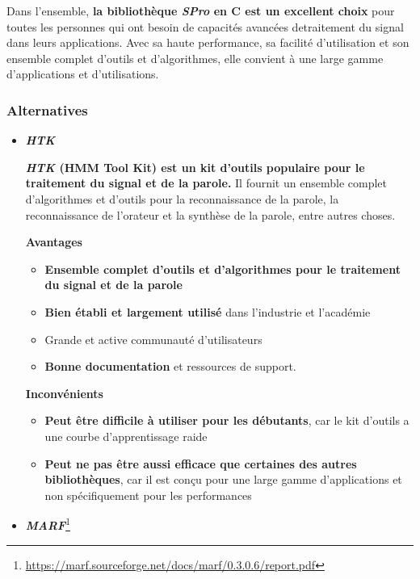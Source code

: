 Dans l'ensemble, \textbf{la bibliothèque \textit{SPro} en C est un excellent choix} pour toutes les personnes qui ont besoin de capacités avancées detraitement
du signal dans leurs applications. Avec sa haute performance, sa facilité d'utilisation et son ensemble complet d'outils et d'algorithmes, elle convient à une
large gamme d'applications et d'utilisations.

\subsubsection*{Alternatives}

\begin{itemize}
      \item \large\textbf{\textit{HTK}} \normalsize

            \textbf{\textit{HTK} (HMM Tool Kit) est un kit d'outils populaire pour le traitement du signal et de la parole.} Il fournit un ensemble complet d'algorithmes et d'outils
            pour la reconnaissance de la parole, la reconnaissance de l'orateur et la synthèse de la parole, entre autres choses.

            \textbf{Avantages}
            \begin{itemize}
                  \item \textbf{Ensemble complet d'outils et d'algorithmes pour le traitement du signal et de la parole}
                  \item \textbf{Bien établi et largement utilisé} dans l'industrie et l'académie
                  \item Grande et active communauté d'utilisateurs
                  \item \textbf{Bonne documentation} et ressources de support.
            \end{itemize}


            \textbf{Inconvénients}
            \begin{itemize}
                  \item \textbf{Peut être difficile à utiliser pour les débutants}, car le kit d'outils a une courbe d'apprentissage raide
                  \item \textbf{Peut ne pas être aussi efficace que certaines des autres bibliothèques}, car il est conçu pour une large gamme
                        d'applications et non spécifiquement pour les performances
            \end{itemize}

      \item\large\textbf{\textit{MARF}}\normalsize\footnote{\url{https://marf.sourceforge.net/docs/marf/0.3.0.6/report.pdf}}



\end{itemize}
